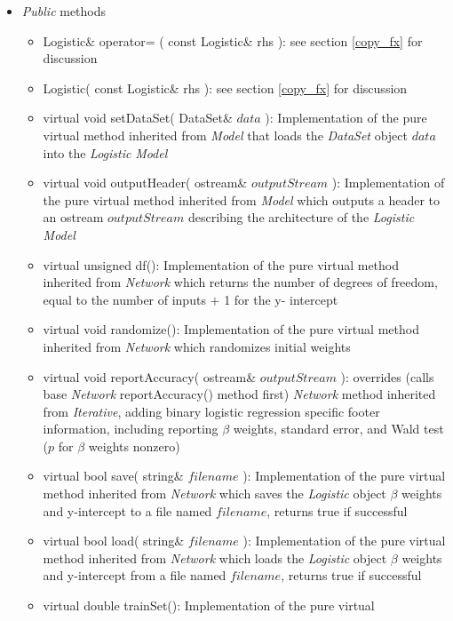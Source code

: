 \documentclass{report}
\begin{document}
\begin{itemize}

\item {\em Public} methods

\begin{itemize}
\item Logistic\& operator= ( const Logistic\& rhs ): see section
      \ref{copy_fx} for discussion
\item Logistic( const Logistic\& rhs ): see section \ref{copy_fx} for
      discussion
\item virtual void setDataSet( DataSet\& $data$ ): Implementation of
      the pure virtual method inherited from {\em Model} that loads
      the {\em DataSet} object $data$ into the {\em Logistic} {\em
      Model}
\item virtual void outputHeader( ostream\& $outputStream$ ):
      Implementation of the pure virtual method inherited from {\em
      Model} which outputs a header to an ostream $outputStream$
      describing the architecture of the {\em Logistic} {\em Model}
\item virtual unsigned df(): Implementation of the pure virtual method
      inherited from {\em Network} which returns the number of degrees
      of freedom, equal to the number of inputs $+$ 1 for the y-
      intercept
\item virtual void randomize(): Implementation of the pure virtual
      method inherited from {\em Network} which randomizes initial
      weights
\item virtual void reportAccuracy( ostream\& $outputStream$ ):
      overrides (calls base {\em Network} reportAccuracy() method
      first) {\em Network} method inherited from {\em Iterative},
      adding binary logistic regression specific footer information,
      including reporting $\beta$ weights, standard error, and Wald
      test ($p$ for $\beta$ weights nonzero)
\item virtual bool save( string\& $filename$ ): Implementation of the
      pure virtual method inherited from {\em Network} which saves the
      {\em Logistic} object $\beta$ weights and y-intercept to a file
      named $filename$, returns true if successful
\item virtual bool load( string\& $filename$ ): Implementation of the
      pure virtual method inherited from {\em Network} which loads the
      {\em Logistic} object $\beta$ weights and y-intercept from a
      file named $filename$, returns true if successful
\item virtual double trainSet(): Implementation of the pure virtual

\end{itemize}
\end{itemize}
\end{document}
